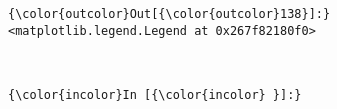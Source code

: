 \documentclass[11pt]{article}
\begin{document}
            \begin{Verbatim}[commandchars=\\\{\}]
{\color{outcolor}Out[{\color{outcolor}138}]:} <matplotlib.legend.Legend at 0x267f82180f0>
\end{Verbatim}
        
    \begin{center}
    \end{center}
    { \hspace*{\fill} \\}
    
    \begin{Verbatim}[commandchars=\\\{\}]
{\color{incolor}In [{\color{incolor} }]:} 
\end{Verbatim}


    
    
    
    
\end{document}
